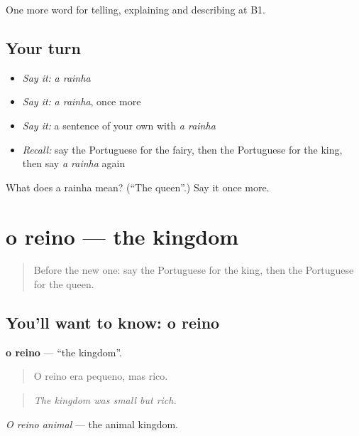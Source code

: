 \begin{grammarlens}[title={What you've built}]
One more word for telling, explaining and describing at B1.
\end{grammarlens}

\subsection*{Your turn}
\begin{itemize}
\raggedright
  \item \emph{Say it:} \emph{a rainha}
  \item \emph{Say it:} \emph{a rainha}, once more
  \item \emph{Say it:} a sentence of your own with \emph{a rainha}
  \item \emph{Recall:} say the Portuguese for the fairy, then the Portuguese for the king, then say \emph{a rainha} again
\end{itemize}

\begin{tcolorbox}[breakable,colback=teal!4,colframe=teal!35!black,title={Before you move on}]
What does a rainha mean? (\textquotedblleft{}The queen\textquotedblright{}.) Say it once more.
\end{tcolorbox}
\section[o reino]{o reino — the kingdom}

\label{lesson:PT-C327-reino}



\begin{quote}
Before the new one: say the Portuguese for the king, then the Portuguese for the queen.
\end{quote}

\subsection*{You'll want to know: o reino}
\textbf{o reino} — \textquotedblleft{}the kingdom\textquotedblright{}.

\begin{quote}
O reino era pequeno, mas rico.
\end{quote}

\begin{quote}
\emph{The kingdom was small but rich.}
\end{quote}

\emph{O reino animal} — the animal kingdom.

